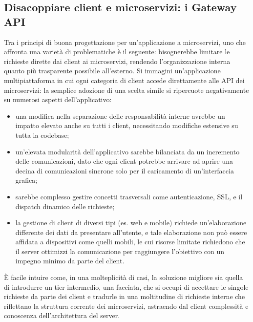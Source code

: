 \subsection{Disacoppiare client e microservizi: i Gateway API}
Tra i principi di buona progettazione per un'applicazione a microservizi, uno che affronta una varietà di problematiche è il seguente: bisognerebbe limitare le richieste dirette dai client ai microservizi, rendendo l'organizzazione interna quanto più trasparente possibile all'esterno.
Si immagini un'applicazione multipiattaforma in cui ogni categoria di client accede direttamente alle API dei microservizi: la semplice adozione di una scelta simile si ripercuote negativamente su numerosi aspetti dell'applicativo:

\begin{itemize}
	\item una modifica nella separazione delle responsabilità interne avrebbe un impatto elevato anche su tutti i client, necessitando modifiche estensive su tutta la codebase;
	\item un'elevata modularità dell'applicativo sarebbe bilanciata da un incremento delle comunicazioni, dato che ogni client potrebbe arrivare ad aprire una decina di comunicazioni sincrone solo per il caricamento di un'interfaccia grafica;
	\item sarebbe complesso gestire concetti trasversali come autenticazione, SSL, e il dispatch dinamico delle richieste;
	\item la gestione di client di diversi tipi (es. web e mobile) richiede un'elaborazione differente dei dati da presentare all'utente, e tale elaborazione non può essere affidata a dispositivi come quelli mobili, le cui risorse limitate richiedono che il server ottimizzi la comunicazione per raggiungere l'obiettivo con un impegno minimo da parte del client.
\end{itemize}

È facile intuire come, in una molteplicità di casi, la soluzione migliore sia quella di introdurre un tier intermedio, una facciata, che si occupi di accettare le singole richieste da parte dei client e tradurle in una moltitudine di richieste interne che riflettano la struttura corrente dei microservizi, astraendo dal client complessità e conoscenza dell'architettura del server.

